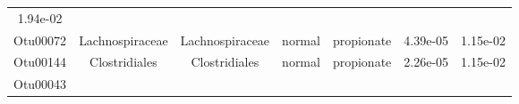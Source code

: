 \documentclass[11pt,]{article}
\begin{document}
\begin{longtable}[]{@{}ccccccc@{}}
\begin{minipage}[t]{0.09\columnwidth}
1.94e-02\strut
\end{minipage}\tabularnewline
\begin{minipage}[t]{0.09\columnwidth}\centering\strut
Otu00072\strut
\end{minipage} & \begin{minipage}[t]{0.17\columnwidth}\centering\strut
Lachnospiraceae\strut
\end{minipage} & \begin{minipage}[t]{0.17\columnwidth}\centering\strut
Lachnospiraceae\strut
\end{minipage} & \begin{minipage}[t]{0.09\columnwidth}\centering\strut
normal\strut
\end{minipage} & \begin{minipage}[t]{0.11\columnwidth}\centering\strut
propionate\strut
\end{minipage} & \begin{minipage}[t]{0.09\columnwidth}\centering\strut
4.39e-05\strut
\end{minipage} & \begin{minipage}[t]{0.09\columnwidth}\centering\strut
1.15e-02\strut
\end{minipage}\tabularnewline
\begin{minipage}[t]{0.09\columnwidth}\centering\strut
Otu00144\strut
\end{minipage} & \begin{minipage}[t]{0.17\columnwidth}\centering\strut
Clostridiales\strut
\end{minipage} & \begin{minipage}[t]{0.17\columnwidth}\centering\strut
Clostridiales\strut
\end{minipage} & \begin{minipage}[t]{0.09\columnwidth}\centering\strut
normal\strut
\end{minipage} & \begin{minipage}[t]{0.11\columnwidth}\centering\strut
propionate\strut
\end{minipage} & \begin{minipage}[t]{0.09\columnwidth}\centering\strut
2.26e-05\strut
\end{minipage} & \begin{minipage}[t]{0.09\columnwidth}\centering\strut
1.15e-02\strut
\end{minipage}\tabularnewline
\begin{minipage}[t]{0.09\columnwidth}\centering\strut
Otu00043\strut
\end{minipage} & \begin{minipage}[t]{0.17\columnwidth}\centering\strut

\end{minipage}
\end{longtable}
\end{document}
